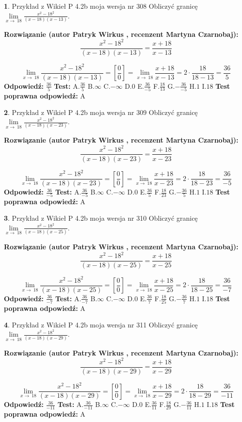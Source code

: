 \documentclass[12pt, a4paper]{article}
\theoremstyle{definition} %
\newtheorem{zad}{}
\newcommand{\zadStart}[1]{\begin{zad}#1\newline}
\newcommand{\zadStop}{\end{zad}}
\newcommand{\rozwStart}[2]{\noindent \textbf{Rozwiązanie (autor #1 , recenzent #2): }\newline}
\newcommand{\rozwStop}{\newline}
\newcommand{\odpStart}{\noindent \textbf{Odpowiedź:}\newline}
\newcommand{\odpStop}{\newline}
\newcommand{\testStart}{\noindent \textbf{Test:}\newline}
\newcommand{\testStop}{\newline}
\newcommand{\kluczStart}{\noindent \textbf{Test poprawna odpowiedź:}\newline}
\newcommand{\kluczStop}{\newline}
\begin{document}
\zadStart{Przykład z Wikieł P 4.2b moja wersja nr 308}
Obliczyć granicę $\lim\limits_{x\to\ 18}\frac{x^{2}-18^{2}}{(x-18)(x-13)}$.
\zadStop
\rozwStart{Patryk Wirkus}{Martyna Czarnobaj}
$$\frac{x^{2}-18^{2}}{(x-18)(x-13)}=\frac{x+18}{x-13}$$

$$\lim\limits_{x\to\ 18}\frac{x^{2}-18^{2}}{(x-18)(x-13)}=[\frac{0}{0}]=\lim\limits_{x\to\ 18}\frac{x+18}{x-13}=2 \cdot \frac{18}{18-13} = \frac{36}{5}$$
\rozwStop
\odpStart
$\frac{36}{5}$
\odpStop
\testStart
A.$\frac{36}{5}$
B.$\infty$
C.$-\infty$
D.$0$
E.$\frac{36}{-5}$
F.$\frac{18}{13}$
G.$-\frac{36}{-5}$
H.$1$
I.$18$
\testStop
\kluczStart
A
\kluczStop



\zadStart{Przykład z Wikieł P 4.2b moja wersja nr 309}
Obliczyć granicę $\lim\limits_{x\to\ 18}\frac{x^{2}-18^{2}}{(x-18)(x-23)}$.
\zadStop
\rozwStart{Patryk Wirkus}{Martyna Czarnobaj}
$$\frac{x^{2}-18^{2}}{(x-18)(x-23)}=\frac{x+18}{x-23}$$

$$\lim\limits_{x\to\ 18}\frac{x^{2}-18^{2}}{(x-18)(x-23)}=[\frac{0}{0}]=\lim\limits_{x\to\ 18}\frac{x+18}{x-23}=2 \cdot \frac{18}{18-23} = \frac{36}{-5}$$
\rozwStop
\odpStart
$\frac{36}{-5}$
\odpStop
\testStart
A.$\frac{36}{-5}$
B.$\infty$
C.$-\infty$
D.$0$
E.$\frac{36}{5}$
F.$\frac{18}{23}$
G.$-\frac{36}{5}$
H.$1$
I.$18$
\testStop
\kluczStart
A
\kluczStop



\zadStart{Przykład z Wikieł P 4.2b moja wersja nr 310}
Obliczyć granicę $\lim\limits_{x\to\ 18}\frac{x^{2}-18^{2}}{(x-18)(x-25)}$.
\zadStop
\rozwStart{Patryk Wirkus}{Martyna Czarnobaj}
$$\frac{x^{2}-18^{2}}{(x-18)(x-25)}=\frac{x+18}{x-25}$$

$$\lim\limits_{x\to\ 18}\frac{x^{2}-18^{2}}{(x-18)(x-25)}=[\frac{0}{0}]=\lim\limits_{x\to\ 18}\frac{x+18}{x-25}=2 \cdot \frac{18}{18-25} = \frac{36}{-7}$$
\rozwStop
\odpStart
$\frac{36}{-7}$
\odpStop
\testStart
A.$\frac{36}{-7}$
B.$\infty$
C.$-\infty$
D.$0$
E.$\frac{36}{7}$
F.$\frac{18}{25}$
G.$-\frac{36}{7}$
H.$1$
I.$18$
\testStop
\kluczStart
A
\kluczStop



\zadStart{Przykład z Wikieł P 4.2b moja wersja nr 311}
Obliczyć granicę $\lim\limits_{x\to\ 18}\frac{x^{2}-18^{2}}{(x-18)(x-29)}$.
\zadStop
\rozwStart{Patryk Wirkus}{Martyna Czarnobaj}
$$\frac{x^{2}-18^{2}}{(x-18)(x-29)}=\frac{x+18}{x-29}$$

$$\lim\limits_{x\to\ 18}\frac{x^{2}-18^{2}}{(x-18)(x-29)}=[\frac{0}{0}]=\lim\limits_{x\to\ 18}\frac{x+18}{x-29}=2 \cdot \frac{18}{18-29} = \frac{36}{-11}$$
\rozwStop
\odpStart
$\frac{36}{-11}$
\odpStop
\testStart
A.$\frac{36}{-11}$
B.$\infty$
C.$-\infty$
D.$0$
E.$\frac{36}{11}$
F.$\frac{18}{29}$
G.$-\frac{36}{11}$
H.$1$
I.$18$
\testStop
\kluczStart
A
\kluczStop
\end{document}
